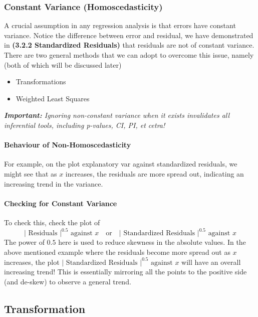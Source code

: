 \documentclass[11pt]{article}
\begin{document}
\subsubsection{Constant Variance (Homoscedasticity)}
A crucial assumption in any regression analysis is that errors have constant variance. \color{BurntOrange} Notice the difference between error and residual, we have demonstrated in \textbf{(3.2.2 Standardized Residuals)} that residuals are not of constant variance. \color{Black} There are two general methods that we can adopt to overcome this issue, namely (both of which will be discussed later)
\begin{itemize}
    \item Transformations
    \item Weighted Least Squares
\end{itemize}
\color{Red}
\textit{\textbf{Important:} Ignoring non-constant variance when it exists invalidates all inferential tools, including p-values, CI, PI, et cetra!}
\color{Black}

\paragraph{Behaviour of Non-Homoscedasticity} For example, on the plot explanatory var against standardized residuals, we might see that as $x$ increases, the residuals are more spread out, indicating an increasing trend in the variance. 

\paragraph{Checking for Constant Variance} To check this, check the plot of
\begin{equation*}
    |\text{ Residuals }|^{0.5} \text { against } x \quad \text{or} \quad |\text { Standardized Residuals }|^{0.5} \text { against } x
\end{equation*}
The power of $0.5$ here is used to reduce skewness in the absolute values. In the above mentioned example where the residuals become more spread out as $x$ increases, the plot $|\text { Standardized Residuals }|^{0.5} \text { against } x$ will have an overall increasing trend! \color{BurntOrange} This is essentially mirroring all the points to the positive side (and de-skew) to observe a general trend. \color{Black}

\subsection{Transformation}
\end{document}
